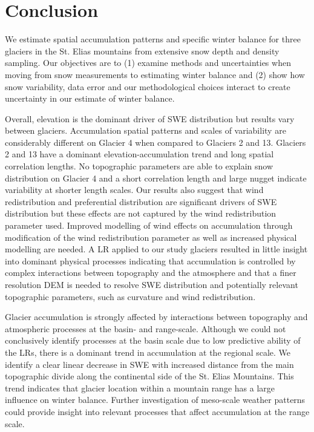 \documentclass[review,oneside, letterpaper]{igs}
\begin{document}
\section{Conclusion}

We estimate spatial accumulation patterns and specific winter balance for three glaciers in the St. Elias mountains from extensive snow depth and density sampling. Our objectives are to (1) examine methods and uncertainties when moving from snow measurements to estimating winter balance and (2) show how snow variability, data error and our methodological choices interact to create uncertainty in our estimate of winter balance.

Overall, elevation is the dominant driver of SWE distribution but results vary between glaciers. Accumulation spatial patterns and scales of variability are considerably different on Glacier 4 when compared to Glaciers 2 and 13. Glaciers 2 and 13 have a dominant elevation-accumulation trend and long spatial correlation lengths. No topographic parameters are able to explain snow distribution on Glacier 4 and a short correlation length and large nugget indicate variability at shorter length scales. Our results also suggest that wind redistribution and preferential distribution are significant drivers of SWE distribution but these effects are not captured by the wind redistribution parameter used. Improved modelling of wind effects on accumulation through modification of the wind redistribution parameter as well as increased physical modelling are needed. A LR applied to our study glaciers resulted in little insight into dominant physical processes indicating that accumulation is controlled by complex interactions between topography and the atmosphere and that a finer resolution DEM is needed to resolve SWE distribution and potentially relevant topographic parameters, such as curvature and wind redistribution.

Glacier accumulation is strongly affected by interactions between topography and atmospheric processes at the basin- and range-scale. Although we could not conclusively identify processes at the basin scale due to low predictive ability of the LRs, there is a dominant trend in accumulation at the regional scale. We identify a clear linear decrease in SWE with increased distance from the main topographic divide along the continental side of the St. Elias Mountains. This trend indicates that glacier location within a mountain range has a large influence on winter balance. Further investigation of meso-scale weather patterns could provide insight into relevant processes that affect accumulation at the range scale.
\end{document}
